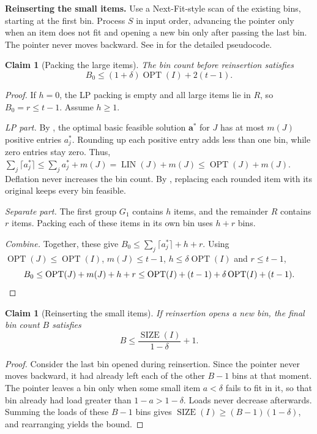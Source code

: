\documentclass[11pt,a4paper,onecolumn]{article}
\theoremstyle{plain}
\newtheorem{claim}[theorem]{Claim}
\theoremstyle{definition}
\theoremstyle{remark}
\DeclareMathOperator{\OPT}{OPT}
\DeclareMathOperator{\SIZE}{SIZE}
\DeclareMathOperator{\LIN}{LIN}
\begin{document}
\smallskip
\noindent\textbf{Reinserting the small items.}
Use a Next-Fit-style scan of the existing bins, starting at the first
bin. Process $S$ in input order, advancing the pointer only when an
item does not fit and opening a new bin only after passing the last
bin. The pointer never moves backward.
See  in  for the detailed pseudocode.

\begin{claim}[Packing the large items]\label{clm:dlvl-large}
The bin count before reinsertion satisfies
\[
  B_0\le(1+\delta)\OPT(I)+2(t-1).
\]
\end{claim}

\begin{proof}
If $h=0$, the LP packing is empty and all large items lie in $R$, so
$B_0=r\le t-1$. Assume $h\ge1$.

\smallskip\noindent\textit{LP part.}
By , the optimal basic feasible solution
$\mathbf{a}^*$ for $J$ has at most $m(J)$ positive entries $a_j^*$.
Rounding up each positive entry adds less than one bin, while zero
entries stay zero. Thus, \mbox{$\textstyle\sum_j\lceil a_j^*\rceil\le\sum_j a_j^*+m(J)=\LIN(J)+m(J)\le\OPT(J)+m(J)$}.
Deflation never increases the bin count. By ,
replacing each rounded item with its original keeps every bin feasible.

\smallskip\noindent\textit{Separate part.}
The first group $G_1$ contains $h$ items, and the remainder $R$
contains $r$ items. Packing each of these items in its own bin
uses $h+r$ bins.

\smallskip\noindent\textit{Combine.}
Together, these give \mbox{$\textstyle B_0\le\sum_j\lceil a_j^*\rceil+h+r$}.
Using $\OPT(J)\le\OPT(I)$, $m(J)\le t-1$, $h\le\delta\OPT(I)$ and
$r\le t-1$,
\[
  B_0\le\OPT(J)+m(J)+h+r
     \le\OPT(I)+(t-1)+\delta\OPT(I)+(t-1).\qedhere
\]
\end{proof}

\begin{claim}[Reinserting the small items]\label{clm:dlvl-small}
If reinsertion opens a new bin, the final bin count $B$ satisfies
\[
  B\le\frac{\SIZE(I)}{1-\delta}+1.
\]
\end{claim}

\begin{proof}
Consider the last bin opened during reinsertion. Since the pointer
never moves backward, it had already left each of the other $B-1$ bins
at that moment. The pointer leaves a bin only when some small item
$a<\delta$ fails to fit in it, so that bin already had load greater
than $1-a>1-\delta$. Loads never decrease afterwards. Summing the loads
of these $B-1$ bins gives $\SIZE(I)\ge(B-1)(1-\delta)$, and
rearranging yields the bound.
\end{proof}
\end{document}
